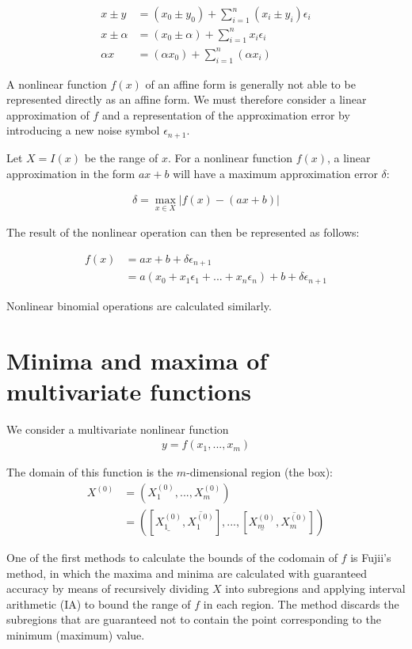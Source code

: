 \documentclass[fontsize=11pt,a4paper]{scrartcl} %
\begin{document}
\begin{align}
    x \pm y &= (x_0 \pm y_0) + \sum_{i=1}^n (x_i \pm y_i) \epsilon_i\\
    x \pm \alpha &= (x_0 \pm \alpha) + \sum_{i=1}^n x_i \epsilon_i\\
    \alpha x &= (\alpha x_0) + \sum_{i=1}^n (\alpha x_i)
\end{align}

A nonlinear function $f(x)$ of an affine form is generally not able to be represented directly as an affine form. We must therefore consider a linear approximation of $f$ and a representation of the approximation error by introducing a new noise symbol $\epsilon_{n+1}$.

Let $X = I(x)$ be the range of $x$. For a nonlinear function $f(x)$, a linear approximation in the form $ax + b$ will have a maximum approximation error $\delta$:

\begin{align}
    \delta = \max_{x \in X} | f(x) - (ax + b) |
\end{align}

The result of the nonlinear operation can then be represented as follows:

\begin{align}
    f(x) &= ax + b + \delta \epsilon_{n+1}\\
         &= a(x_0 + x_1 \epsilon_1 + ... + x_n \epsilon_n) + b + \delta \epsilon_{n+1}
\end{align}

Nonlinear binomial operations are calculated similarly.

\section{Minima and maxima of multivariate functions}

We consider a multivariate nonlinear function
\begin{align}
    y = f(x_1, ..., x_m)
\end{align}

The domain of this function is the $m$-dimensional region (the box):
\begin{align}
    X^{(0)} &= \left( X_1^{(0)}, ..., X_m^{(0)}  \right)\\
            &= \left( [\underline{X_1^{(0)}}, \overline{X_1^{(0)}}], ..., [\underline{X_m^{(0)}}, \overline{X_m^{(0)}}] \right)
\end{align}

One of the first methods to calculate the bounds of the codomain of $f$ is Fujii's method, in which the maxima and minima are calculated with guaranteed accuracy by means of recursively dividing $X$ into subregions and applying interval arithmetic (IA) to bound the range of $f$ in each region. The method discards the subregions that are guaranteed not to contain the point corresponding to the minimum (maximum) value. 
\end{document}
